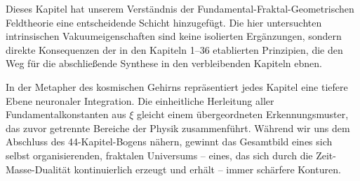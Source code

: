 	Dieses Kapitel hat unserem Verständnis der Fundamental-Fraktal-Geometrischen Feldtheorie eine entscheidende Schicht hinzugefügt. Die hier untersuchten intrinsischen Vakuumeigenschaften sind keine isolierten Ergänzungen, sondern direkte Konsequenzen der in den Kapiteln 1–36 etablierten Prinzipien, die den Weg für die abschließende Synthese in den verbleibenden Kapiteln ebnen.
	
	In der Metapher des kosmischen Gehirns repräsentiert jedes Kapitel eine tiefere Ebene neuronaler Integration. Die einheitliche Herleitung aller Fundamentalkonstanten aus \(\xi\) gleicht einem übergeordneten Erkennungsmuster, das zuvor getrennte Bereiche der Physik zusammenführt. Während wir uns dem Abschluss des 44-Kapitel-Bogens nähern, gewinnt das Gesamtbild eines sich selbst organisierenden, fraktalen Universums – eines, das sich durch die Zeit-Masse-Dualität kontinuierlich erzeugt und erhält – immer schärfere Konturen.


